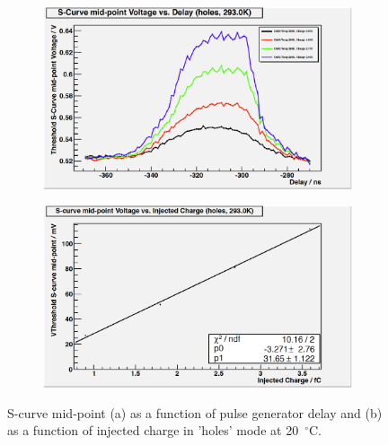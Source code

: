 \begin{figure}[hbtp]
   \centering
   \begin{subfigure}[h]{0.5\textwidth}%
   	 \centering
   	 \includegraphics[width=\textwidth]{Chapters/07_Appendices/07d_ServiceWork/Images/scurve_midpoint_v_pg_delay_holes_20deg}
   	 \caption{}
   	 \label{subfig:scurve_midpoint_v_pg_delay_holes_20deg}
   \end{subfigure}
   \begin{subfigure}[h]{0.5\textwidth} %
   	 \centering
   	 \includegraphics[width=\textwidth]{Chapters/07_Appendices/07d_ServiceWork/Images/scurve_midpoint_v_injected_charge_holes_20deg}\hfill
   	 \caption{}
   	 \label{subfig:scurve_midpoint_v_injected_charge_holes_20deg}
   \end{subfigure}
     \caption{S-curve mid-point (a) as a function of pulse generator delay and (b) as a function of injected
     charge in 'holes' mode at 20~$^{\circ}$C.}
     \label{fig:midpoint_v_delay_and_charge_holes_20deg}
\end{figure}


